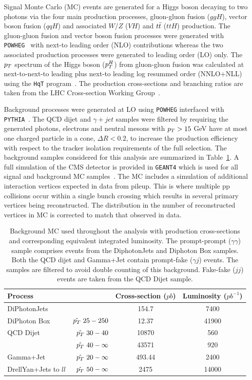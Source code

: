Signal Monte Carlo (MC) events are generated for a Higgs boson decaying to two photons via the four main 
production processes, gluon-gluon fusion ($ggH$), vector boson fusion ($qqH$) and associated $W/Z$ ($VH$) 
and $t\bar{t}$ ($ttH$) production.
The gluon-gluon fusion and vector boson fusion processes were generated with \texttt{POWHEG}~\citep{powheg} with 
next-to leading order (NLO) contributions whereas
the two associated production processes were generated to leading order (LO) only.
The $p_{T}$ spectrum of the Higgs boson ($p_{T}^{H}$) from gluon-gluon fusion was calculated at
next-to-next-to leading plus next-to leading log resummed order (NNLO+NLL) using the \texttt{HqT} program~\citep{hqt}.
The production cross-sections and branching ratios are taken from the LHC Cross-section Working Group~\citep{lhcxswg}.

Background processes were generated at LO using \texttt{POWHEG} interfaced with \texttt{PYTHIA}~\citep{pythia}.
The QCD dijet and $\gamma+jet$ samples were filtered by requiring the generated photons, electrons and neutral
mesons with $p_{T}>15$ GeV have at most one charged particle in a cone, $\Delta R<0.2$, to increase the 
production efficiency with respect to the tracker isolation requirements of the full selection.
The background samples considered for this analysis are summarized in Table~\ref{tab:backgroundmc}.
A full simulation of the CMS detector is provided in \texttt{GEANT4} which is used for all signal
and background MC samples~\citep{geant4}. The MC includes a simulation of additional interaction vertices expected in data
from pileup. This is where multiple pp collisions occur within a single bunch crossing which results in several
primary vertices being reconstructed. The distribution in the number of reconstructed vertices in 
MC is corrected to match that observed in data.

\begin{table}
\begin{tabular}{|l r|c|c|}
\hline
\textbf{Process}  & &  \textbf{Cross-section} ($pb$) & \textbf{Luminosity} ($pb^{-1}$)\\
\hline
\hline
DiPhotonJets & & 154.7 & 7400 \\
\hline
DiPhoton Box & $\hat{p_{T}}~25-250$ & 12.37 & 41900 \\
\hline 
QCD Dijet    & $\hat{p_{T}}~30-40$      & 10870 & 560 \\
	     & $\hat{p_{T}}~40-\infty$  & 43571 & 920 \\
\hline 
Gamma+Jet    & $\hat{p_{T}}~20-\infty$  & 493.44& 2400 \\
\hline 
DrellYan+Jets to $ll$  & $\hat{p_{T}}~50-\infty$  & 2475& 14000 \\
\hline
\end{tabular}
\caption{Background MC used throughout the analysis with production cross-sections and 
corresponding equivalent integrated luminosity. The prompt-prompt ($\gamma\gamma$) sample 
comprises events from the DiphotonJets and Diphoton Box samples. Both the QCD dijet and Gamma+Jet
 contain prompt-fake ($\gamma j$) events. The samples are filtered to avoid double counting
of this background. Fake-fake ($jj$) events are taken from the QCD Dijet sample.}
\label{tab:backgroundmc}
\end{table}


